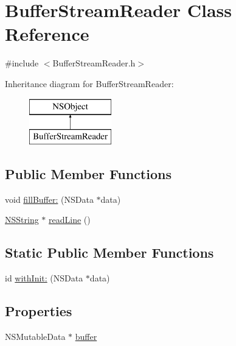 \hypertarget{interface_buffer_stream_reader}{
\section{\-Buffer\-Stream\-Reader \-Class \-Reference}
\label{interface_buffer_stream_reader}
}


{\ttfamily \#include $<$\-Buffer\-Stream\-Reader.\-h$>$}

\-Inheritance diagram for \-Buffer\-Stream\-Reader\-:\begin{figure}[H]
\begin{center}
\leavevmode
\includegraphics[height=2.000000cm]{interface_buffer_stream_reader}
\end{center}
\end{figure}
\subsection*{\-Public \-Member \-Functions}
\begin{DoxyCompactItemize}
\item 
void \hyperlink{interface_buffer_stream_reader_aff1ea5fde8f03682937ec526727b4c3e}{fill\-Buffer\-:} (\-N\-S\-Data $\ast$data)
\item 
\hyperlink{class_n_s_string}{\-N\-S\-String} $\ast$ \hyperlink{interface_buffer_stream_reader_a4f2bc7154fab94a1dd3a5681df909b16}{read\-Line} ()
\end{DoxyCompactItemize}
\subsection*{\-Static \-Public \-Member \-Functions}
\begin{DoxyCompactItemize}
\item 
id \hyperlink{interface_buffer_stream_reader_ae7c48ed0afe8fddeb304bfc4ccd9abca}{with\-Init\-:} (\-N\-S\-Data $\ast$data)
\end{DoxyCompactItemize}
\subsection*{\-Properties}
\begin{DoxyCompactItemize}
\item 
\-N\-S\-Mutable\-Data $\ast$ \hyperlink{interface_buffer_stream_reader_a9a4a1ea1471f72ade325999dc39fd420}{buffer}
\end{DoxyCompactItemize}


